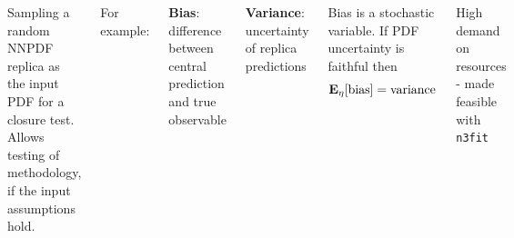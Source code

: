 \begin{frame}
\begin{columns}[t]
    Sampling a random NNPDF replica as the input PDF for a closure test.
    \reqnomode
    Allows testing of methodology, if the input assumptions hold.

    \vspace{8pt}
    For example:
    \vspace{8pt}
    
    \textbf{Bias}: difference between central prediction and true observable

    \vspace{8pt}
    \textbf{Variance}: uncertainty of replica predictions

    \vspace{8pt}
    
    Bias is a stochastic variable. If PDF uncertainty is faithful then
    \begin{equation}
        \mathbf{E}_{\eta}[{\rm bias}] = {\rm variance}
    \end{equation}

    \vspace{8pt}
    
    High demand on resources - made feasible with \texttt{n3fit}
    \end{columns}
\end{frame}
%
